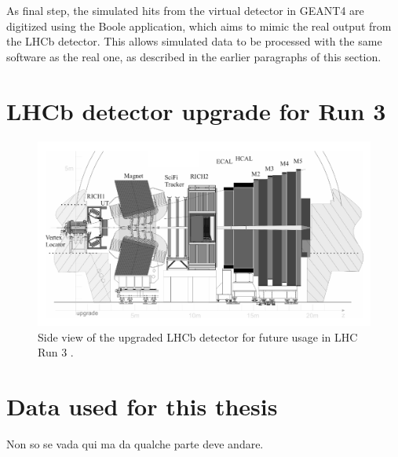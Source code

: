 As final step, the simulated hits from the virtual detector in GEANT4 are digitized using the Boole application, which aims to mimic the real output from the LHCb detector.
This allows simulated data to be processed with the same software as the real one, as described in the earlier paragraphs of this section.

\section{LHCb detector upgrade for Run 3}

\begin{figure}[t]
	\centering
	\includegraphics[width=\textwidth]{graphics/02-lhcb/lhcb_diagram_run3.png}
	\caption[LHCb detector side view (Run 3).]{Side view of the upgraded LHCb detector for future usage in LHC Run 3 \cite{Piucci_2017}.}
	\label{fig:2:lhcb_diagram_run3}
\end{figure}

\section{Data used for this thesis}
Non so se vada qui ma da qualche parte deve andare.